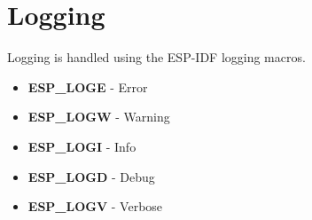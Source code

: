 \section{Logging}
Logging is handled using the ESP-IDF logging macros.
\begin{itemize}
    \item \textbf{ESP\_LOGE} - Error
    \item \textbf{ESP\_LOGW} - Warning
    \item \textbf{ESP\_LOGI} - Info
    \item \textbf{ESP\_LOGD} - Debug
    \item \textbf{ESP\_LOGV} - Verbose
\end{itemize}


